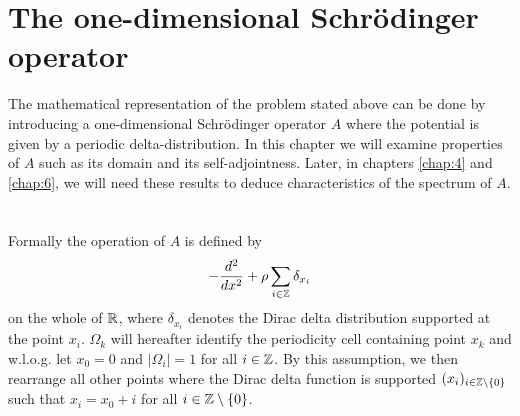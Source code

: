 \chapter{The one-dimensional Schrödinger operator} \label{chap:3}

The mathematical representation of the problem stated above can be done by introducing a one-dimensional Schrödinger operator $A$ where the potential is given by a periodic delta-distribution. In this chapter we will examine properties of $A$ such as its domain and its self-adjointness. Later, in chapters \ref{chap:4} and \ref{chap:6}, we will need these results to deduce characteristics of the spectrum of $A$. ~\\ ~\\
Formally the operation of $A$ is defined by
\begin{equation}
	- \frac{d^{2}}{dx^{2}} + \rho \sum_{i \in \mathbb{Z}} \delta_{x_{i}} \label{the-operator-A-formally}
\end{equation}
on the whole of $\mathbb{R}$, where $\delta_{x_{i}}$ denotes the Dirac delta distribution supported at the point $x_{i}$. $\Omega_{k}$ will hereafter identify the periodicity cell containing point $x_{k}$ and w.l.o.g. let $x_{0} = 0$ and $|\Omega_{i}| = 1$ for all $i \in \mathbb{Z}$. By this assumption, we then rearrange all other points where the Dirac delta function is supported $(x_{i})_{i \in \mathbb{Z} \setminus \{0\}}$ such that $x_{i} = x_{0} + i$ for all $i \in \mathbb{Z} \setminus \{0\}$. 
~\\  

